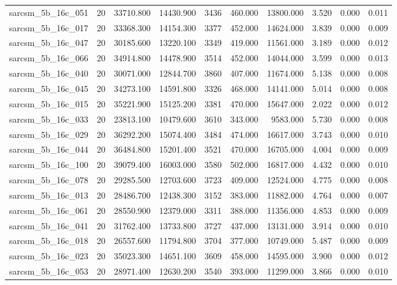 \begin{tabular}{lrrrrrrrrr}
sarcsm\_5b\_16c\_051 & 20 & 33710.800 & 14430.900 & 3436 & 460.000 & 13800.000 & 3.520 & 0.000 & 0.011 \\
sarcsm\_5b\_16c\_017 & 20 & 33368.300 & 14154.300 & 3377 & 452.000 & 14624.000 & 3.839 & 0.000 & 0.009 \\
sarcsm\_5b\_16c\_047 & 20 & 30185.600 & 13220.100 & 3349 & 419.000 & 11561.000 & 3.189 & 0.000 & 0.012 \\
sarcsm\_5b\_16c\_066 & 20 & 34914.800 & 14478.900 & 3514 & 452.000 & 14044.000 & 3.599 & 0.000 & 0.013 \\
sarcsm\_5b\_16c\_040 & 20 & 30071.000 & 12844.700 & 3860 & 407.000 & 11674.000 & 5.138 & 0.000 & 0.008 \\
sarcsm\_5b\_16c\_045 & 20 & 34273.100 & 14591.800 & 3326 & 468.000 & 14141.000 & 5.014 & 0.000 & 0.008 \\
sarcsm\_5b\_16c\_015 & 20 & 35221.900 & 15125.200 & 3381 & 470.000 & 15647.000 & 2.022 & 0.000 & 0.012 \\
sarcsm\_5b\_16c\_033 & 20 & 23813.100 & 10479.600 & 3610 & 343.000 & 9583.000 & 5.730 & 0.000 & 0.008 \\
sarcsm\_5b\_16c\_029 & 20 & 36292.200 & 15074.400 & 3484 & 474.000 & 16617.000 & 3.743 & 0.000 & 0.010 \\
sarcsm\_5b\_16c\_044 & 20 & 36484.800 & 15201.400 & 3521 & 470.000 & 16705.000 & 4.004 & 0.000 & 0.009 \\
sarcsm\_5b\_16c\_100 & 20 & 39079.400 & 16003.000 & 3580 & 502.000 & 16817.000 & 4.432 & 0.000 & 0.010 \\
sarcsm\_5b\_16c\_078 & 20 & 29285.500 & 12703.600 & 3723 & 409.000 & 12524.000 & 4.775 & 0.000 & 0.008 \\
sarcsm\_5b\_16c\_013 & 20 & 28486.700 & 12438.300 & 3152 & 383.000 & 11882.000 & 4.764 & 0.000 & 0.007 \\
sarcsm\_5b\_16c\_061 & 20 & 28550.900 & 12379.000 & 3311 & 388.000 & 11356.000 & 4.853 & 0.000 & 0.009 \\
sarcsm\_5b\_16c\_041 & 20 & 31762.400 & 13733.800 & 3727 & 437.000 & 13131.000 & 3.914 & 0.000 & 0.010 \\
sarcsm\_5b\_16c\_018 & 20 & 26557.600 & 11794.800 & 3704 & 377.000 & 10749.000 & 5.487 & 0.000 & 0.009 \\
sarcsm\_5b\_16c\_023 & 20 & 35023.300 & 14651.100 & 3609 & 458.000 & 14595.000 & 3.900 & 0.000 & 0.012 \\
sarcsm\_5b\_16c\_053 & 20 & 28971.400 & 12630.200 & 3540 & 393.000 & 11299.000 & 3.866 & 0.000 & 0.010 \\

\end{tabular}
